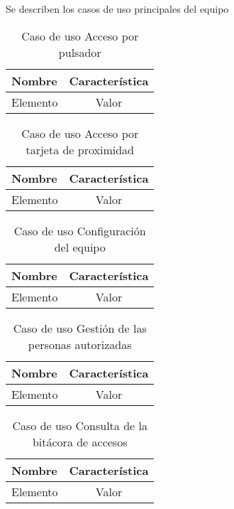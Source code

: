 Se describen los casos de uso principales del equipo

\begin{table}[ht]
	\centering
	\caption{Caso de uso Acceso por pulsador}
	\begin{tabular}{l c}    
		\toprule
		\textbf{Nombre} 	& \textbf{Característica}	\\
		\midrule
		Elemento 			& Valor	\\
		\bottomrule
		\hline
	\end{tabular}
	\label{tab:CasoPulsador}
\end{table}

\begin{table}[ht]
	\centering
	\caption{Caso de uso Acceso por tarjeta de proximidad}
	\begin{tabular}{l c}    
		\toprule
		\textbf{Nombre} 	& \textbf{Característica}	\\
		\midrule
		Elemento 			& Valor	\\
		\bottomrule
		\hline
	\end{tabular}
	\label{tab:CasoTarjeta}
\end{table}

\begin{table}[ht]
	\centering
	\caption{Caso de uso Configuración del equipo}
	\begin{tabular}{l c}    
		\toprule
		\textbf{Nombre} 	& \textbf{Característica}	\\
		\midrule
		Elemento 			& Valor	\\
		\bottomrule
		\hline
	\end{tabular}
	\label{tab:CasoConfiguracion}
\end{table}

\begin{table}[ht]
	\centering
	\caption{Caso de uso Gestión de las personas autorizadas}
	\begin{tabular}{l c}    
		\toprule
		\textbf{Nombre} 	& \textbf{Característica}	\\
		\midrule
		Elemento 			& Valor	\\
		\bottomrule
		\hline
	\end{tabular}
	\label{tab:CasoAutorizacion}
\end{table}

\begin{table}[ht]
	\centering
	\caption{Caso de uso Consulta de la bitácora de accesos}
	\begin{tabular}{l c}    
		\toprule
		\textbf{Nombre} 	& \textbf{Característica}	\\
		\midrule
		Elemento 			& Valor	\\
		\bottomrule
		\hline
	\end{tabular}
	\label{tab:CasoBitacora}
\end{table}

